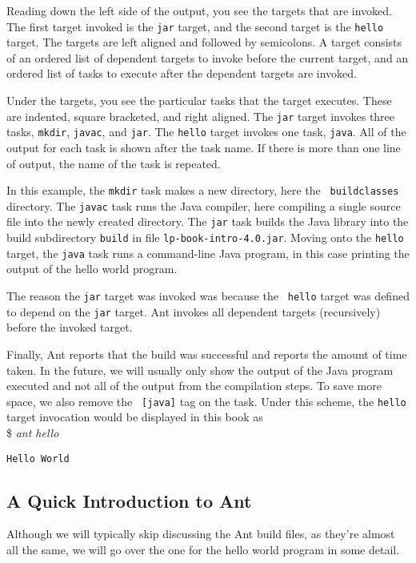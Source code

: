 Reading down the left side of the output, you see the targets that are
invoked.  The first target invoked is the {\tt jar} target, and the
second target is the {\tt hello} target.  The targets are left aligned
and followed by semicolons.  A target consists of an ordered list of
dependent targets to invoke before the current target, and an ordered
list of tasks to execute after the dependent targets are invoked.

Under the targets, you see the particular tasks that the target
executes.  These are indented, square bracketed, and right aligned.
The {\tt jar} target invokes three tasks, {\tt mkdir}, {\tt javac},
and {\tt jar}.  The {\tt hello} target invokes one task, {\tt java}.
All of the output for each task is shown after the task name.  If
there is more than one line of output, the name of the task is
repeated.

In this example, the {\tt mkdir} task makes a new directory, here the {\tt
build{\bk}classes} directory.  The {\tt javac} task runs the
Java compiler, here compiling a single source file into the
newly created directory.  The {\tt jar} task builds the Java
library into the build subdirectory {\tt build} in file
{\tt lp-book-intro-4.0.jar}.  Moving onto the {\tt hello} target,
the {\tt java} task runs a command-line Java program, in this
case printing the output of the hello world program.

The reason the {\tt jar} target was invoked was because the {\tt
hello} target was defined to depend on the {\tt jar} target.  Ant
invokes all dependent targets (recursively) before the invoked target.

Finally, Ant reports that the build was successful and reports the
amount of time taken.  In the future, we will usually only show the
output of the Java program executed and not all of the output from the
compilation steps.  To save more space, we also remove the {\tt
[java]} tag on the task.  Under this scheme, the {\tt hello} target
invocation would be displayed in this book as
\\[8pt]
{\ttfamily \$ \it\ttfamily ant hello}
{\small\begin{verbatim}
Hello World
\end{verbatim}}


\subsection{A Quick Introduction to Ant}

Although we will typically skip discussing the Ant build files,
as they're almost all the same, we will go over the one for the
hello world program in some detail.  

